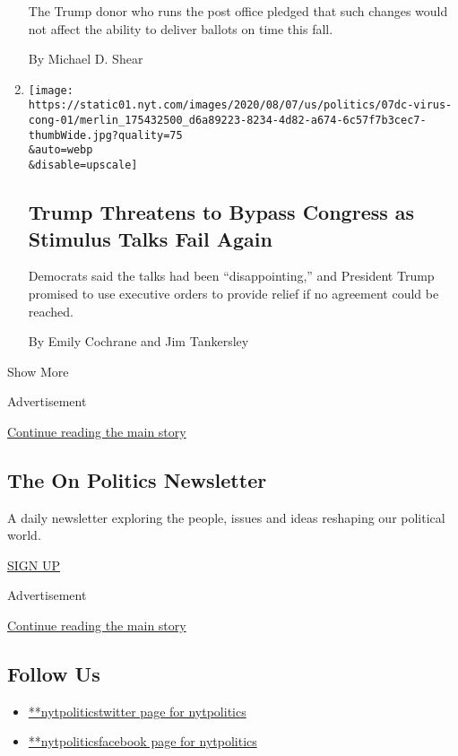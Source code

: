\begin{enumerate}
  The Trump donor who runs the post office pledged that such changes
  would not affect the ability to deliver ballots on time this fall.

  By Michael D. Shear
\item
  \href{/2020/08/07/us/politics/trump-congress-stimulus.html}{}

  \texttt{[image: https://static01.nyt.com/images/2020/08/07/us/politics/07dc-virus-cong-01/merlin\_175432500\_d6a89223-8234-4d82-a674-6c57f7b3cec7-thumbWide.jpg?quality=75\\\&auto=webp\\\&disable=upscale]}

  \hypertarget{trump-threatens-to-bypass-congress-as-stimulus-talks-fail-again-1}{%
  \subsection{Trump Threatens to Bypass Congress as Stimulus Talks Fail
  Again}\label{trump-threatens-to-bypass-congress-as-stimulus-talks-fail-again-1}}

  Democrats said the talks had been ``disappointing,'' and President
  Trump promised to use executive orders to provide relief if no
  agreement could be reached.

  By Emily Cochrane and Jim Tankersley
\end{enumerate}

Show More

Advertisement

\protect\hyperlink{after-mid2}{Continue reading the main story}

\hypertarget{the-on-politics-newsletter}{%
\subsection{The On Politics
Newsletter}\label{the-on-politics-newsletter}}

A daily newsletter exploring the people, issues and ideas reshaping our
political world.

\href{/newsletters/signup/CN}{SIGN UP}

Advertisement

\protect\hyperlink{after-mktg}{Continue reading the main story}

\hypertarget{follow-us}{%
\subsection{Follow Us}\label{follow-us}}

\begin{itemize}
\tightlist
\item
  \href{https://twitter.com/nytpolitics}{**nytpoliticstwitter page for
  nytpolitics}
\item
  \href{https://www.facebook.com/nytpolitics}{**nytpoliticsfacebook page
  for nytpolitics}
\end{itemize}

